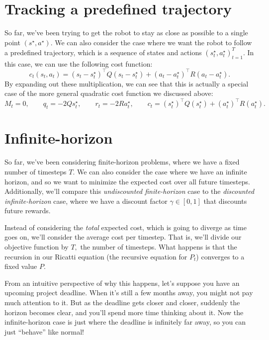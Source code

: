 \documentclass[../main/main]{subfiles}
\begin{document}
\section{Tracking a predefined trajectory}

So far, we've been trying to get the robot to stay as close as possible to
a single point $(s^\star, a^\star).$ We can also consider the case where we
want the robot to follow a predefined trajectory, which is a sequence of
states and actions $(s_t^\star, a_t^\star)_{t = 1}^T$. In this case, we can use the following cost function:
\[
    c_t(s_t, a_t) = (s_t - s^\star_t)^\top Q (s_t - s^\star_t) + (a_t - a^\star_t)^\top R (a_t - a^\star_t).
\]
By expanding out these multiplication, we can see that this is actually a special case of the more general quadratic cost function we discussed
above: \[
    M_t = 0, \qquad q_t = -2Q s^\star_t, \qquad r_t = -2R a^\star_t, \qquad c_t = (s^\star_t)^\top Q (s^\star_t) + (a^\star_t)^\top R (a^\star_t).
\]


\section{Infinite-horizon}

So far, we've been considering finite-horizon problems, where we have a fixed number of timesteps $T$. We can also consider the case where we have an infinite horizon, and so we want to minimize the expected cost over all future timesteps.
Additionally, we'll compare this \emph{undiscounted finite-horizon} case to the \emph{discounted infinite-horizon} case, where we have a discount factor $\gamma \in [0, 1]$ that discounts future rewards.

Instead of considering the \emph{total} expected cost, which is going to diverge as time goes on,
we'll consider the average cost per timestep. That is, we'll divide our objective
function by $T,$ the number of timesteps.
What happens is that the recursion in our Ricatti equation (the recursive equation
for $P_t$) converges to a fixed value $P$.

From an intuitive perspective of why this happens, let's suppose you have an upcoming project deadline. When it's still a few months away, you might not pay
much attention to it. But as the deadline gets closer and closer, suddenly the
horizon becomes clear, and you'll spend more time thinking about it.
Now the infinite-horizon case is just where the deadline is infinitely far away, so you can just ``behave'' like normal!
\end{document}
